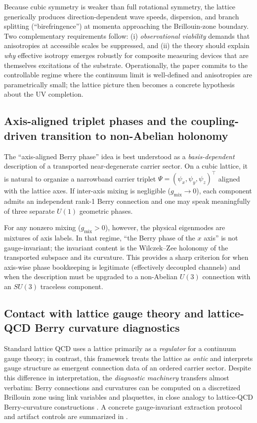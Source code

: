 Because cubic symmetry is weaker than full rotational symmetry, the lattice generically produces
direction-dependent wave speeds, dispersion, and branch splitting (``birefringence'') at momenta approaching the
Brillouin-zone boundary.
Two complementary requirements follow:
(i) \emph{observational viability} demands that anisotropies at accessible scales be suppressed, and
(ii) the theory should explain \emph{why} effective isotropy emerges robustly for composite measuring devices that are
themselves excitations of the substrate.
Operationally, the paper commits to the controllable regime where the continuum limit is well-defined and
anisotropies are parametrically small; the lattice picture then becomes a concrete hypothesis about the UV completion.

\subsection{Axis-aligned triplet phases and the coupling-driven transition to non-Abelian holonomy}
\label{subsec:discussion-axis-triplet}

The ``axis-aligned Berry phase'' idea is best understood as a \emph{basis-dependent} description of a transported
near-degenerate carrier sector.
On a cubic lattice, it is natural to organize a narrowband carrier triplet
$\Psi=(\psi_x,\psi_y,\psi_z)^\top$ aligned with the lattice axes.
If inter-axis mixing is negligible ($g_{\mathrm{mix}}\to 0$), each component admits an independent rank-1 Berry connection and one
may speak meaningfully of three separate $U(1)$ geometric phases.

For any nonzero mixing ($g_{\mathrm{mix}}>0$), however, the physical eigenmodes are mixtures of axis labels.
In that regime, ``the Berry phase of the $x$ axis'' is not gauge-invariant; the invariant content is the
Wilczek--Zee holonomy of the transported subspace and its curvature.
This provides a sharp criterion for when axis-wise phase bookkeeping is legitimate (effectively decoupled channels)
and when the description must be upgraded to a non-Abelian $U(3)$ connection with an $SU(3)$ traceless component.

\subsection{Contact with lattice gauge theory and lattice-QCD Berry curvature diagnostics}
\label{subsec:discussion-lqcd}

Standard lattice QCD uses a lattice primarily as a \emph{regulator} for a continuum gauge theory; in contrast, this
framework treats the lattice as \emph{ontic} and interprets gauge structure as emergent connection data of an
ordered carrier sector.
Despite this difference in interpretation, the \emph{diagnostic machinery} transfers almost verbatim:
Berry connections and curvatures can be computed on a discretized Brillouin zone using link variables and plaquettes,
in close analogy to lattice-QCD Berry-curvature constructions \citep{PuYamamoto2018BerryLatticeQCD,Yamamoto2016BerryPhaseLatticeQCD,Fukui2005ChernDiscretizedBZ}.
A concrete gauge-invariant extraction protocol and artifact controls are summarized in .

